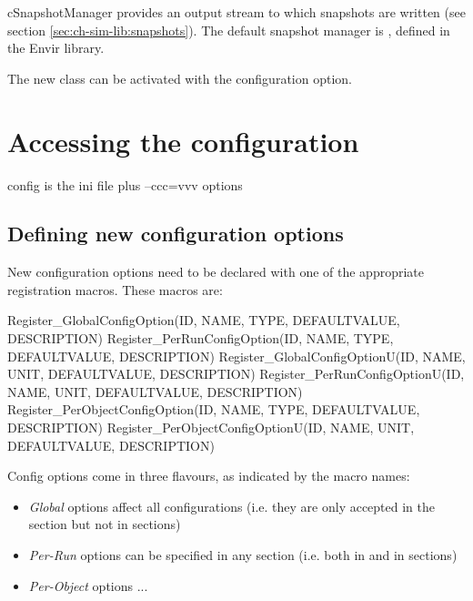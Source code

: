 cSnapshotManager provides an output stream to which snapshots are written
(see section \ref{sec:ch-sim-lib:snapshots}). The default snapshot manager
is , defined in the Envir library.

The new class can be activated with the 
configuration option.


\section{Accessing the configuration}
\label{sec:plugin-exts:accessing-config}

config is the ini file plus --ccc=vvv options

\subsection{Defining new configuration options}

New configuration options need to be declared with one of the appropriate
registration macros. These macros are:

\begin{cpp}
Register_GlobalConfigOption(ID, NAME, TYPE, DEFAULTVALUE, DESCRIPTION)
Register_PerRunConfigOption(ID, NAME, TYPE, DEFAULTVALUE, DESCRIPTION)
Register_GlobalConfigOptionU(ID, NAME, UNIT, DEFAULTVALUE, DESCRIPTION)
Register_PerRunConfigOptionU(ID, NAME, UNIT, DEFAULTVALUE, DESCRIPTION)
Register_PerObjectConfigOption(ID, NAME, TYPE, DEFAULTVALUE, DESCRIPTION)
Register_PerObjectConfigOptionU(ID, NAME, UNIT, DEFAULTVALUE, DESCRIPTION)
\end{cpp}

Config options come in three flavours, as indicated by the macro names:

\begin{itemize}
  \item \textit{Global} options affect all configurations (i.e. they are
      only accepted in the \ttt{[General]} section but not in
       sections)
  \item \textit{Per-Run} options can be specified in any section
      (i.e. both in \ttt{[General]} and in  sections)
  \item \textit{Per-Object} options ...
\end{itemize}

